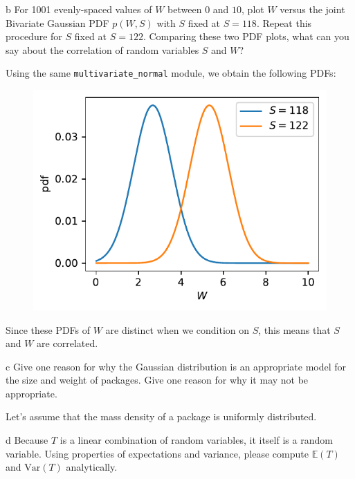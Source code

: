 \documentclass[expanded]{pset}
\begin{document}
\begin{parts}
  \begin{part}{b}
     For 1001 evenly-spaced values of $W$ between $0$ and $10$, plot $W$ versus the joint Bivariate Gaussian PDF $p(W, S)$ with $S$ fixed at $S=118$. Repeat this procedure for $S$ fixed at $S=122$. Comparing these two PDF plots, what can you say about the correlation of random variables $S$ and $W$?
  \end{part}

  Using the same \texttt{multivariate\_normal} module, we obtain the following PDFs:

  \begin{figure}[ht]
    \centering
    \includegraphics[]{3b.pdf}
  \end{figure}\noindent
  Since these PDFs of $W$ are distinct when we condition on $S$, this means that $S$ and $W$ are correlated.

  \begin{part}{c}
     Give one reason for why the Gaussian distribution is an appropriate model for the size and weight of packages. Give one reason for why it may not be appropriate.
  \end{part}

  Let's assume that the mass density of a package is uniformly distributed.

  \begin{part}{d}
    Because $T$ is a linear combination of random variables, it itself is a random variable. Using properties of expectations and variance, please compute $\mathbb{E}(T)$ and $\mathrm{Var}(T)$ analytically.
  \end{part}


\end{parts}
\end{document}
